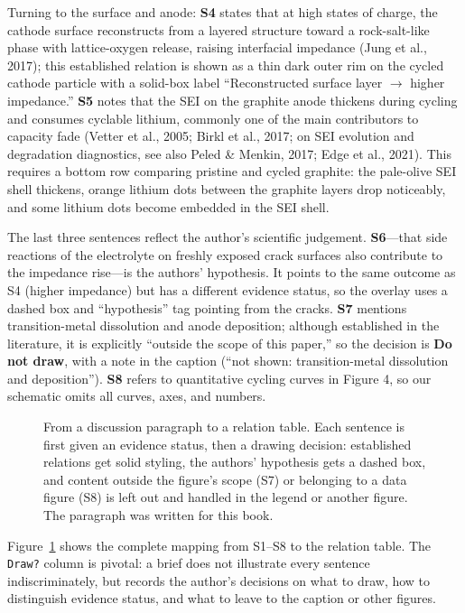 Turning to the surface and anode: \textbf{S4} states that at high states of charge, the cathode surface reconstructs from a layered structure toward a rock-salt-like phase with lattice-oxygen release, raising interfacial impedance (Jung et al., 2017); this established relation is shown as a thin dark outer rim on the cycled cathode particle with a solid-box label ``Reconstructed surface layer \ensuremath{\rightarrow} higher impedance.'' \textbf{S5} notes that the SEI on the graphite anode thickens during cycling and consumes cyclable lithium, commonly one of the main contributors to capacity fade (Vetter et al., 2005; Birkl et al., 2017; on SEI evolution and degradation diagnostics, see also Peled \& Menkin, 2017; Edge et al., 2021). This requires a bottom row comparing pristine and cycled graphite: the pale-olive SEI shell thickens, orange lithium dots between the graphite layers drop noticeably, and some lithium dots become embedded in the SEI shell.

The last three sentences reflect the author's scientific judgement. \textbf{S6}---that side reactions of the electrolyte on freshly exposed crack surfaces also contribute to the impedance rise---is the authors' hypothesis. It points to the same outcome as S4 (higher impedance) but has a different evidence status, so the overlay uses a dashed box and ``hypothesis'' tag pointing from the cracks. \textbf{S7} mentions transition-metal dissolution and anode deposition; although established in the literature, it is explicitly ``outside the scope of this paper,'' so the decision is \textbf{Do not draw}, with a note in the caption (``not shown: transition-metal dissolution and deposition''). \textbf{S8} refers to quantitative cycling curves in Figure 4, so our schematic omits all curves, axes, and numbers.

\begin{figure}[htbp]\centering

\caption{From a discussion paragraph to a relation table. Each sentence is first given an evidence status, then a drawing decision: established relations get solid styling, the authors' hypothesis gets a dashed box, and content outside the figure's scope (S7) or belonging to a data figure (S8) is left out and handled in the legend or another figure. The paragraph was written for this book.}\label{fig:ch02-03}
\end{figure}

Figure~\ref{fig:ch02-03} shows the complete mapping from S1--S8 to the relation table. The \texttt{Draw?} column is pivotal: a brief does not illustrate every sentence indiscriminately, but records the author's decisions on what to draw, how to distinguish evidence status, and what to leave to the caption or other figures.

